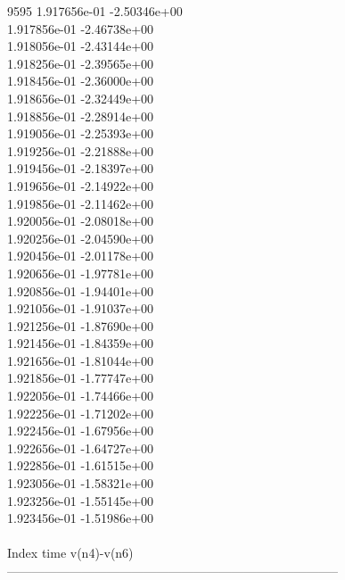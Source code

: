 9595	1.917656e-01	-2.50346e+00	\\ 	1.917856e-01	-2.46738e+00	\\ 	1.918056e-01	-2.43144e+00	\\ 	1.918256e-01	-2.39565e+00	\\ 	1.918456e-01	-2.36000e+00	\\ 	1.918656e-01	-2.32449e+00	\\ 	1.918856e-01	-2.28914e+00	\\ 	1.919056e-01	-2.25393e+00	\\ 	1.919256e-01	-2.21888e+00	\\ 	1.919456e-01	-2.18397e+00	\\ 	1.919656e-01	-2.14922e+00	\\ 	1.919856e-01	-2.11462e+00	\\ 	1.920056e-01	-2.08018e+00	\\ 	1.920256e-01	-2.04590e+00	\\ 	1.920456e-01	-2.01178e+00	\\ 	1.920656e-01	-1.97781e+00	\\ 	1.920856e-01	-1.94401e+00	\\ 	1.921056e-01	-1.91037e+00	\\ 	1.921256e-01	-1.87690e+00	\\ 	1.921456e-01	-1.84359e+00	\\ 	1.921656e-01	-1.81044e+00	\\ 	1.921856e-01	-1.77747e+00	\\ 	1.922056e-01	-1.74466e+00	\\ 	1.922256e-01	-1.71202e+00	\\ 	1.922456e-01	-1.67956e+00	\\ 	1.922656e-01	-1.64727e+00	\\ 	1.922856e-01	-1.61515e+00	\\ 	1.923056e-01	-1.58321e+00	\\ 	1.923256e-01	-1.55145e+00	\\ 	1.923456e-01	-1.51986e+00	\\ \hline
\\ \hline
Index   time            v(n4)-v(n6)     \\ \hline
--------------------------------------------------------------------------------\\ \hline
